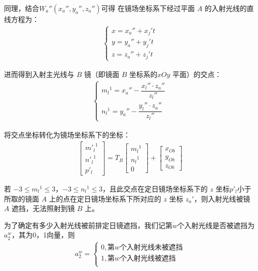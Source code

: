 \documentclass[../main.tex]{subfiles}
\begin{document}
\par 同理，结合$ W_a''(x_a'', y_a'', z_a'')$可得
在镜场坐标系下经过平面 $A$ 的入射光线的直线方程为：
\begin{align} \label{1.66}
 \begin{cases}
x = x_a'' + x_j' t \\
y = y_a'' + y_j' t \\
z = z_a'' + z_j' t
\end{cases}
\end{align}
\par 进而得到入射主光线与 $B$ 镜（即镜面 $B$ 坐标系的$xOy$ 平面）的交点：
\begin{align}\label{4.12}
  \begin{cases}
{m_l}^1 = x_a'' - \dfrac{x_l'' \cdot z_a''}{z_l''} \\
{n_l}^1 = y_a'' - \dfrac{y_l'' \cdot z_a''}{z_l''}
\end{cases}
\end{align}
\par 将交点坐标转化为镜场坐标系下的坐标：
\begin{align}\label{4.2}
\begin{bmatrix}
{m'_l}^1 \\
{n'_l}^1 \\
p'_l
\end{bmatrix}
= T_B \begin{bmatrix}
{m_l}^1  \\
{n_l}^1 \\
0
\end{bmatrix}
+ \begin{bmatrix}
x_{Ob} \\
y_{Ob} \\
z_{Ob}
\end{bmatrix}
\end{align}
\par 若 $-3 \leq {m_l}^1 \leq 3$，$-3 \leq {n_l}^1 \leq 3$，且此交点在定日镜场坐标系下的 $z$ 坐标$p'_l$小于所取的镜面 $A$ 上的点在定日镜场坐标系下所对应的 $z$ 坐标 $z_a'$，则入射光线被镜 \( A \) 遮挡，无法照射到镜 \( B \) 上。\
\par 为了确定有多少入射光线被前排定日镜遮挡，我们记第$w$个入射光线是否被遮挡为$a_2^w$，其为0，1向量，则
\begin{align}    \label{1.82}
a_2^w = 
\begin{cases} 
0,\text{第}w\text{个入射光线未被遮挡}\\
1,\text{第}w\text{个入射光线被遮挡}\\
\end{cases}
 \end{align}
\end{document}
